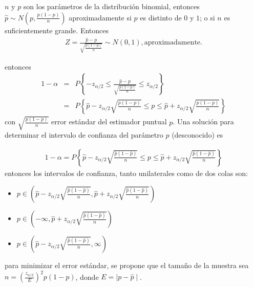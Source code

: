 $n$ y $p$ son los par\'ametros de la distribuci\'on binomial, entonces $\hat{p}\sim N\left(p,\frac{p\left(1-p\right)}{n}\right)$ aproximadamente si $p$ es distinto de $0$ y $1$; o si $n$ es suficientemente grande. Entonces
\begin{eqnarray*}
Z=\frac{\hat{p}-p}{\sqrt{\frac{p\left(1-p\right)}{n}}}\sim N\left(0,1\right),\textrm{aproximadamente.}
\end{eqnarray*}
 
 
entonces
\begin{eqnarray*}
1-\alpha&=&P\left\{-z_{\alpha/2}\leq\frac{\hat{p}-p}{\sqrt{\frac{p\left(1-p\right)}{n}}}\leq z_{\alpha/2}\right\}\\
&=&P\left\{\hat{p}-z_{\alpha/2}\sqrt{\frac{p\left(1-p\right)}{n}}\leq p\leq \hat{p}+z_{\alpha/2}\sqrt{\frac{p\left(1-p\right)}{n}}\right\}
\end{eqnarray*}
con $\sqrt{\frac{p\left(1-p\right)}{n}}$ error est\'andar del estimador puntual $p$. Una soluci\'on para determinar el intervalo de confianza del par\'ametro $p$ (desconocido) es







\begin{eqnarray*}
1-\alpha=P\left\{\hat{p}-z_{\alpha/2}\sqrt{\frac{\hat{p}\left(1-\hat{p}\right)}{n}}\leq p\leq \hat{p}+z_{\alpha/2}\sqrt{\frac{\hat{p}\left(1-\hat{p}\right)}{n}}\right\}
\end{eqnarray*}
entonces los intervalos de confianza, tanto unilaterales como de dos colas son: 
\begin{itemize}
\item $p\in \left(\hat{p}-z_{\alpha/2}\sqrt{\frac{\hat{p}\left(1-\hat{p}\right)}{n}},\hat{p}+z_{\alpha/2}\sqrt{\frac{\hat{p}\left(1-\hat{p}\right)}{n}}\right)$

\item $p\in \left(-\infty,\hat{p}+z_{\alpha/2}\sqrt{\frac{\hat{p}\left(1-\hat{p}\right)}{n}}\right)$

\item $p\in \left(\hat{p}-z_{\alpha/2}\sqrt{\frac{\hat{p}\left(1-\hat{p}\right)}{n}},\infty\right)$

\end{itemize}
para minimizar el error est\'andar, se propone que el tama\~no de la muestra sea $n= \left(\frac{z_{\alpha/2}}{E}\right)^{2}p\left(1-p\right)$, donde $E=\mid p-\hat{p}\mid$.



